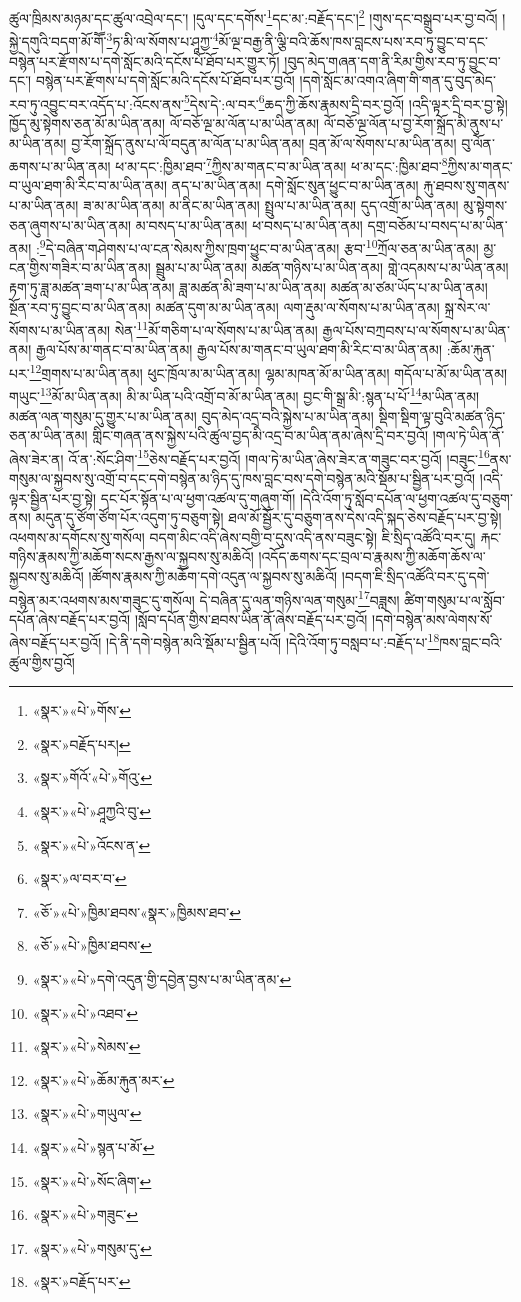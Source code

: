 ཚུལ་ཁྲིམས་མཉམ་དང་ཚུལ་འབྲེལ་དང་། །དུལ་དང་དགོས་\footnote{«སྣར་»«པེ་»གོས་}དང་མ་:བརྗོད་དང་།\footnote{«སྣར་»བརྗོད་པར།} །གུས་དང་བསྒྲུབ་པར་བྱ་བའོ། །སྐྱེ་དགུའི་བདག་མོ་གཽ་\footnote{«སྣར་»གོའོ་«པེ་»གོའུ་}ཏ་མི་ལ་སོགས་པ་ཤཱཀྱ་\footnote{«སྣར་»«པེ་»ཤཱཀྱའི་བུ་}མོ་ལྔ་བརྒྱ་ནི་ལྕི་བའི་ཆོས་ཁས་བླངས་པས་རབ་ཏུ་བྱུང་བ་དང་བསྙེན་པར་རྫོགས་པ་དགེ་སློང་མའི་དངོས་པོ་ཐོབ་པར་གྱུར་ཏོ། །བུད་མེད་གཞན་དག་ནི་རིམ་གྱིས་རབ་ཏུ་བྱུང་བ་དང་། བསྙེན་པར་རྫོགས་པ་དགེ་སློང་མའི་དངོས་པོ་ཐོབ་པར་བྱའོ། །དགེ་སློང་མ་འགའ་ཞིག་གི་གན་དུ་བུད་མེད་རབ་ཏུ་འབྱུང་བར་འདོད་པ་:འོངས་ནས་\footnote{«སྣར་»«པེ་»འོངས་ན་}དེས་དེ་:ལ་བར་\footnote{«སྣར་»ལ་བར་བ་}ཆད་ཀྱི་ཆོས་རྣམས་དྲི་བར་བྱའོ། །འདི་ལྟར་དྲི་བར་བྱ་སྟེ། ཁྱོད་མུ་སྟེགས་ཅན་མོ་མ་ཡིན་ནམ། ལོ་བཅོ་ལྔ་མ་ལོན་པ་མ་ཡིན་ནམ། ལོ་བཅོ་ལྔ་ལོན་པ་བྱ་རོག་སྐྲོད་མི་ནུས་པ་མ་ཡིན་ནམ། བྱ་རོག་སྐྲོད་ནུས་པ་ལོ་བདུན་མ་ལོན་པ་མ་ཡིན་ནམ། བྲན་མོ་ལ་སོགས་པ་མ་ཡིན་ནམ། བུ་ལོན་ཆགས་པ་མ་ཡིན་ནམ། ཕ་མ་དང་:ཁྱིམ་ཐབ་\footnote{«ཅོ་»«པེ་»ཁྱིམ་ཐབས་«སྣར་»ཁྱིམས་ཐབ་}ཀྱིས་མ་གནང་བ་མ་ཡིན་ནམ། ཕ་མ་དང་:ཁྱིམ་ཐབ་\footnote{«ཅོ་»«པེ་»ཁྱིམ་ཐབས་}ཀྱིས་མ་གནང་བ་ཡུལ་ཐག་མི་རིང་བ་མ་ཡིན་ནམ། ནད་པ་མ་ཡིན་ནམ། དགེ་སློང་སུན་ཕྱུང་བ་མ་ཡིན་ནམ། རྐུ་ཐབས་སུ་གནས་པ་མ་ཡིན་ནམ། ཟ་མ་མ་ཡིན་ནམ། མ་ནིང་མ་ཡིན་ནམ། སྤྲུལ་པ་མ་ཡིན་ནམ། དུད་འགྲོ་མ་ཡིན་ནམ། མུ་སྟེགས་ཅན་ཞུགས་པ་མ་ཡིན་ནམ། མ་བསད་པ་མ་ཡིན་ནམ། ཕ་བསད་པ་མ་ཡིན་ནམ། དགྲ་བཅོམ་པ་བསད་པ་མ་ཡིན་ནམ། :\footnote{«སྣར་»«པེ་»དགེ་འདུན་གྱི་དབྱེན་བྱས་པ་མ་ཡིན་ནམ་}དེ་བཞིན་གཤེགས་པ་ལ་ངན་སེམས་ཀྱིས་ཁྲག་ཕྱུང་བ་མ་ཡིན་ནམ། རྩབ་\footnote{«སྣར་»«པེ་»འཐབ་}ཀྲོལ་ཅན་མ་ཡིན་ནམ། མྱ་ངན་གྱིས་གཟིར་བ་མ་ཡིན་ནམ། སྦྲུམ་པ་མ་ཡིན་ནམ། མཚན་གཉིས་པ་མ་ཡིན་ནམ། གླེ་འདམས་པ་མ་ཡིན་ནམ། རྟག་ཏུ་ཟླ་མཚན་ཟག་པ་མ་ཡིན་ནམ། ཟླ་མཚན་མི་ཟག་པ་མ་ཡིན་ནམ། མཚན་མ་ཙམ་ཡོད་པ་མ་ཡིན་ནམ། སྔོན་རབ་ཏུ་བྱུང་བ་མ་ཡིན་ནམ། མཚན་དུག་མ་མ་ཡིན་ནམ། ལག་རྡུམ་ལ་སོགས་པ་མ་ཡིན་ནམ། སྐྲ་སེར་ལ་སོགས་པ་མ་ཡིན་ནམ། སེན་\footnote{«སྣར་»«པེ་»སེམས་}མོ་གཅིག་པ་ལ་སོགས་པ་མ་ཡིན་ནམ། རྒྱལ་པོས་བཀྲབས་པ་ལ་སོགས་པ་མ་ཡིན་ནམ། རྒྱལ་པོས་མ་གནང་བ་མ་ཡིན་ནམ། རྒྱལ་པོས་མ་གནང་བ་ཡུལ་ཐག་མི་རིང་བ་མ་ཡིན་ནམ། :ཆོམ་རྐུན་པར་\footnote{«སྣར་»«པེ་»ཆོམ་རྐུན་མར་}གྲགས་པ་མ་ཡིན་ནམ། ཕུང་ཁྲོལ་མ་མ་ཡིན་ནམ། ལྷམ་མཁན་མོ་མ་ཡིན་ནམ། གདོལ་པ་མོ་མ་ཡིན་ནམ། གཡུང་\footnote{«སྣར་»«པེ་»གཡུལ་}མོ་མ་ཡིན་ནམ། མི་མ་ཡིན་པའི་འགྲོ་བ་མོ་མ་ཡིན་ནམ། བྱང་གི་སྒྲ་མི་:སྙན་པ་པོ་\footnote{«སྣར་»«པེ་»སྙན་པ་མོ་}མ་ཡིན་ནམ། མཚན་ལན་གསུམ་དུ་གྱུར་པ་མ་ཡིན་ནམ། བུད་མེད་འདྲ་བའི་སྐྱེས་པ་མ་ཡིན་ནམ། སྡིག་སྡིག་ལྟ་བུའི་མཚན་ཉིད་ཅན་མ་ཡིན་ནམ། གླིང་གཞན་ནས་སྐྱེས་པའི་ཚུལ་བྱད་མི་འདྲ་བ་མ་ཡིན་ནམ་ཞེས་དྲི་བར་བྱའོ། །གལ་ཏེ་ཡིན་ནོ་ཞེས་ཟེར་ན། འོ་ན་:སོང་ཤིག་\footnote{«སྣར་»«པེ་»སོང་ཞིག་}ཅེས་བརྗོད་པར་བྱའོ། །གལ་ཏེ་མ་ཡིན་ཞེས་ཟེར་ན་གཟུང་བར་བྱའོ། །བཟུང་\footnote{«སྣར་»«པེ་»གཟུང་}ནས་གསུམ་ལ་སྐྱབས་སུ་འགྲོ་བ་དང་དགེ་བསྙེན་མ་ཉིད་དུ་ཁས་བླང་བས་དགེ་བསྙེན་མའི་སྡོམ་པ་སྦྱིན་པར་བྱའོ། །འདི་ལྟར་སྦྱིན་པར་བྱ་སྟེ། དང་པོར་སྟོན་པ་ལ་ཕྱག་འཚལ་དུ་གཞུག་གོ། །དེའི་འོག་ཏུ་སློབ་དཔོན་ལ་ཕྱག་འཚལ་དུ་བཅུག་ནས། མདུན་དུ་ཙོག་ཙོག་པོར་འདུག་ཏུ་བཅུག་སྟེ། ཐལ་མོ་སྦྱོར་དུ་བཅུག་ནས་དེས་འདི་སྐད་ཅེས་བརྗོད་པར་བྱ་སྟེ། འཕགས་མ་དགོངས་སུ་གསོལ། བདག་མིང་འདི་ཞེས་བགྱི་བ་དུས་འདི་ནས་བཟུང་སྟེ། ཇི་སྲིད་འཚོའི་བར་དུ། རྐང་གཉིས་རྣམས་ཀྱི་མཆོག་སངས་རྒྱས་ལ་སྐྱབས་སུ་མཆིའོ། །འདོད་ཆགས་དང་བྲལ་བ་རྣམས་ཀྱི་མཆོག་ཆོས་ལ་སྐྱབས་སུ་མཆིའོ། །ཚོགས་རྣམས་ཀྱི་མཆོག་དགེ་འདུན་ལ་སྐྱབས་སུ་མཆིའོ། །བདག་ཇི་སྲིད་འཚོའི་བར་དུ་དགེ་བསྙེན་མར་འཕགས་མས་གཟུང་དུ་གསོལ། དེ་བཞིན་དུ་ལན་གཉིས་ལན་གསུམ་\footnote{«སྣར་»«པེ་»གསུམ་དུ་}བཟླས། ཚིག་གསུམ་པ་ལ་སློབ་དཔོན་ཞེས་བརྗོད་པར་བྱའོ། །སློབ་དཔོན་གྱིས་ཐབས་ཡིན་ནོ་ཞེས་བརྗོད་པར་བྱའོ། །དགེ་བསྙེན་མས་ལེགས་སོ་ཞེས་བརྗོད་པར་བྱའོ། །དེ་ནི་དགེ་བསྙེན་མའི་སྡོམ་པ་སྦྱིན་པའོ། །དེའི་འོག་ཏུ་བསླབ་པ་:བརྗོད་པ་\footnote{«སྣར་»བརྗོད་པར་}ཁས་བླང་བའི་ཚུལ་གྱིས་བྱའོ། 